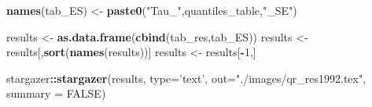 \documentclass[]{book}
\newenvironment{Shaded}{\begin{snugshade}}{\end{snugshade}}
\newcommand{\KeywordTok}[1]{\textcolor[rgb]{0.13,0.29,0.53}{\textbf{#1}}}
\newcommand{\DataTypeTok}[1]{\textcolor[rgb]{0.13,0.29,0.53}{#1}}
\newcommand{\DecValTok}[1]{\textcolor[rgb]{0.00,0.00,0.81}{#1}}
\newcommand{\StringTok}[1]{\textcolor[rgb]{0.31,0.60,0.02}{#1}}
\newcommand{\OtherTok}[1]{\textcolor[rgb]{0.56,0.35,0.01}{#1}}
\newcommand{\OperatorTok}[1]{\textcolor[rgb]{0.81,0.36,0.00}{\textbf{#1}}}
\newcommand{\NormalTok}[1]{#1}
\begin{document}
\begin{Shaded}
\begin{Highlighting}[]
\KeywordTok{names}\NormalTok{(tab_ES) <-}\StringTok{ }\KeywordTok{paste0}\NormalTok{(}\StringTok{"Tau_"}\NormalTok{,quantiles_table,}\StringTok{"_SE"}\NormalTok{)}

\NormalTok{results <-}\StringTok{ }\KeywordTok{as.data.frame}\NormalTok{(}\KeywordTok{cbind}\NormalTok{(tab_res,tab_ES))}
\NormalTok{results <-}\StringTok{ }\NormalTok{results[,}\KeywordTok{sort}\NormalTok{(}\KeywordTok{names}\NormalTok{(results))]}
\NormalTok{results <-}\StringTok{ }\NormalTok{results[}\OperatorTok{-}\DecValTok{1}\NormalTok{,]}
\end{Highlighting}
\end{Shaded}

\begin{Shaded}
\begin{Highlighting}[]
\NormalTok{stargazer}\OperatorTok{::}\KeywordTok{stargazer}\NormalTok{(results, }\DataTypeTok{type=}\StringTok{'text'}\NormalTok{, }\DataTypeTok{out=}\StringTok{"./images/qr_res1992.tex"}\NormalTok{, }\DataTypeTok{summary =} \OtherTok{FALSE}\NormalTok{)}
\end{Highlighting}
\end{Shaded}
\end{document}
